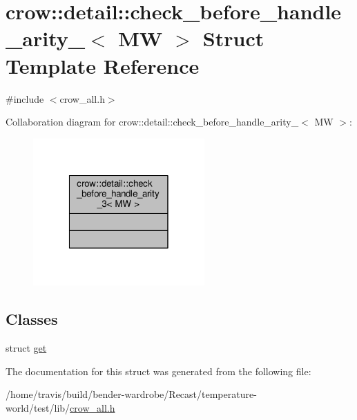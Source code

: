 \hypertarget{structcrow_1_1detail_1_1check__before__handle__arity__3}{\section{crow\-:\-:detail\-:\-:check\-\_\-before\-\_\-handle\-\_\-arity\-\_$<$ M\-W $>$ Struct Template Reference}
\label{structcrow_1_1detail_1_1check__before__handle__arity__3}
}


{\ttfamily \#include $<$crow\-\_\-all.\-h$>$}



Collaboration diagram for crow\-:\-:detail\-:\-:check\-\_\-before\-\_\-handle\-\_\-arity\-\_$<$ M\-W $>$\-:
\nopagebreak
\begin{figure}[H]
\begin{center}
\leavevmode
\includegraphics[width=186pt]{structcrow_1_1detail_1_1check__before__handle__arity__3__coll__graph}
\end{center}
\end{figure}
\subsection*{Classes}
\begin{DoxyCompactItemize}
\item 
struct \hyperlink{structcrow_1_1detail_1_1check__before__handle__arity__3_1_1get}{get}
\end{DoxyCompactItemize}


The documentation for this struct was generated from the following file\-:\begin{DoxyCompactItemize}
\item 
/home/travis/build/bender-\/wardrobe/\-Recast/temperature-\/world/test/lib/\hyperlink{crow__all_8h}{crow\-\_\-all.\-h}\end{DoxyCompactItemize}
